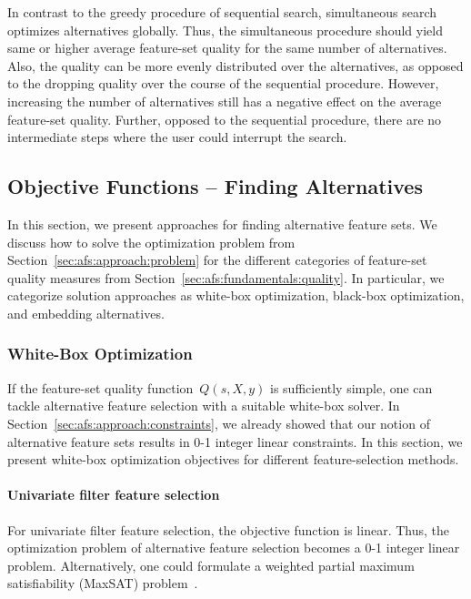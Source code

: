 \documentclass{article}
\theoremstyle{definition}
\begin{document}
In contrast to the greedy procedure of sequential search, simultaneous search optimizes alternatives globally.
Thus, the simultaneous procedure should yield same or higher average feature-set quality for the same number of alternatives.
Also, the quality can be more evenly distributed over the alternatives, as opposed to the dropping quality over the course of the sequential procedure.
However, increasing the number of alternatives still has a negative effect on the average feature-set quality.
Further, opposed to the sequential procedure, there are no intermediate steps where the user could interrupt the search.

\subsection{Objective Functions -- Finding Alternatives}
\label{sec:afs:approach:objectives}

In this section, we present approaches for finding alternative feature sets.
We discuss how to solve the optimization problem from Section~\ref{sec:afs:approach:problem} for the different categories of feature-set quality measures from Section~\ref{sec:afs:fundamentals:quality}.
In particular, we categorize solution approaches as white-box optimization, black-box optimization, and embedding alternatives.

\subsubsection{White-Box Optimization}
\label{sec:afs:approach:objectives:white-box}

If the feature-set quality function~$Q(s,X,y)$ is sufficiently simple, one can tackle alternative feature selection with a suitable white-box solver.
In Section~\ref{sec:afs:approach:constraints}, we already showed that our notion of alternative feature sets results in 0-1 integer linear constraints.
In this section, we present white-box optimization objectives for different feature-selection methods.

\paragraph{Univariate filter feature selection}

For univariate filter feature selection, the objective function is linear.
Thus, the optimization problem of alternative feature selection becomes a 0-1 integer linear problem.
Alternatively, one could formulate a weighted partial maximum satisfiability (MaxSAT) problem~\cite{li2021maxsat}.
\end{document}
